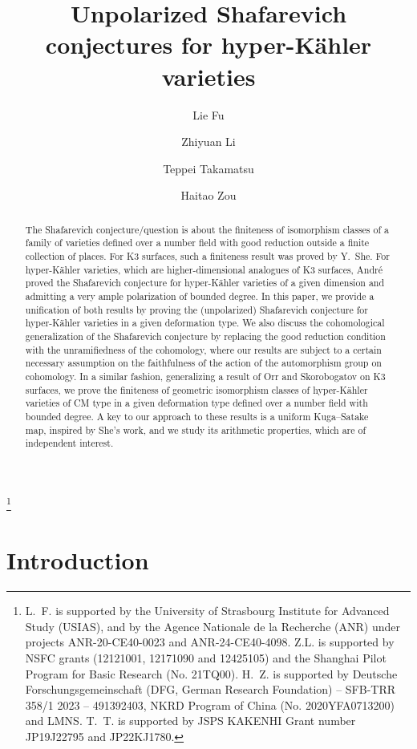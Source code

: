 \documentclass[11pt,reqno,oneside]{amsart}
\title{Unpolarized Shafarevich conjectures for hyper-K{\"a}hler varieties}
\author[L. Fu]{Lie Fu}
\author[Z. Li]{Zhiyuan Li}\address{Shanghai Center for Mathematical Sciences, Fudan University, 2005 Songhu Road 200438, Shanghai, China}\email{zhiyuan\_li@fudan.edu.cn}
\author[T. Takamatsu]{Teppei Takamatsu}
\author[H. Zou]{Haitao Zou}
\numberwithin{equation}{section}
\theoremstyle{definition}
\begin{document}
\thanks{L.~F. is supported by the University of Strasbourg Institute for Advanced Study (USIAS), and by the Agence Nationale de la Recherche (ANR) under projects ANR-20-CE40-0023 and ANR-24-CE40-4098.  Z.L. is supported by NSFC grants (12121001, 12171090 and 12425105) and the Shanghai Pilot Program for Basic Research (No. 21TQ00).  H.~Z. is  supported by  Deutsche Forschungsgemeinschaft (DFG, German Research Foundation) -- SFB-TRR 358/1 2023 -- 491392403, NKRD Program of China (No. 2020YFA0713200) and LMNS. T.~T. is supported by JSPS KAKENHI Grant number JP19J22795 and JP22KJ1780.}

\begin{abstract} 
The Shafarevich conjecture/question is about the finiteness of isomorphism classes of a family of varieties defined over a number field with good reduction outside a finite collection of places. For K3 surfaces, such a finiteness result was proved by Y.~She. For hyper-Kähler varieties, which are higher-dimensional analogues of K3 surfaces, Andr\'e proved the Shafarevich conjecture for hyper-Kähler varieties of a given dimension and admitting a very ample polarization of bounded degree. In this paper, we provide a unification of both results by proving the (unpolarized) Shafarevich conjecture for hyper-Kähler varieties in a given deformation type. We also discuss the cohomological generalization of the Shafarevich conjecture by replacing the good reduction condition with the unramifiedness of the cohomology, where our results are subject to a certain necessary assumption on the faithfulness of the action of the automorphism group on cohomology.
In a similar fashion, generalizing a result of Orr and Skorobogatov on K3 surfaces, we prove the finiteness of geometric isomorphism classes of hyper-Kähler varieties of CM type in a given deformation type defined over a number field with bounded degree. A key to our approach to these results is a uniform Kuga--Satake map, inspired by She's work, and we study its arithmetic properties, which are of independent interest.
\end{abstract}
\maketitle
\setcounter{tocdepth}{1}
\tableofcontents
\section{Introduction}
\end{document}
